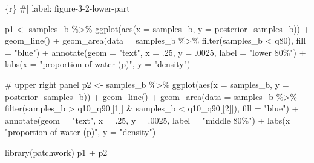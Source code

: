 \documentclass[
  letterpaper,
  DIV=11,
  numbers=noendperiod]{scrreprt}
\newenvironment{Shaded}{\begin{snugshade}}{\end{snugshade}}
\newcommand{\AttributeTok}[1]{\textcolor[rgb]{0.40,0.45,0.13}{#1}}
\newcommand{\CommentTok}[1]{\textcolor[rgb]{0.37,0.37,0.37}{#1}}
\newcommand{\DecValTok}[1]{\textcolor[rgb]{0.68,0.00,0.00}{#1}}
\newcommand{\FunctionTok}[1]{\textcolor[rgb]{0.28,0.35,0.67}{#1}}
\newcommand{\InformationTok}[1]{\textcolor[rgb]{0.37,0.37,0.37}{#1}}
\newcommand{\NormalTok}[1]{\textcolor[rgb]{0.00,0.23,0.31}{#1}}
\newcommand{\OtherTok}[1]{\textcolor[rgb]{0.00,0.23,0.31}{#1}}
\newcommand{\SpecialCharTok}[1]{\textcolor[rgb]{0.37,0.37,0.37}{#1}}
\newcommand{\StringTok}[1]{\textcolor[rgb]{0.13,0.47,0.30}{#1}}
\begin{document}
\begin{Shaded}
\begin{Highlighting}[]
\InformationTok{\textasciigrave{}\textasciigrave{}\textasciigrave{}\{r\}}
\CommentTok{\#| label: figure{-}3{-}2{-}lower{-}part}

\NormalTok{p1 }\OtherTok{\textless{}{-}}
\NormalTok{  samples\_b }\SpecialCharTok{\%\textgreater{}\%} 
  \FunctionTok{ggplot}\NormalTok{(}\FunctionTok{aes}\NormalTok{(}\AttributeTok{x =}\NormalTok{ samples\_b, }\AttributeTok{y =}\NormalTok{ posterior\_samples\_b)) }\SpecialCharTok{+}
  \FunctionTok{geom\_line}\NormalTok{() }\SpecialCharTok{+}
  \FunctionTok{geom\_area}\NormalTok{(}\AttributeTok{data =}\NormalTok{ samples\_b }\SpecialCharTok{\%\textgreater{}\%} \FunctionTok{filter}\NormalTok{(samples\_b }\SpecialCharTok{\textless{}}\NormalTok{ q80), }\AttributeTok{fill =} \StringTok{"blue"}\NormalTok{) }\SpecialCharTok{+}
  \FunctionTok{annotate}\NormalTok{(}\AttributeTok{geom =} \StringTok{"text"}\NormalTok{,}
           \AttributeTok{x =}\NormalTok{ .}\DecValTok{25}\NormalTok{, }\AttributeTok{y =}\NormalTok{ .}\DecValTok{0025}\NormalTok{,}
           \AttributeTok{label =} \StringTok{"lower 80\%"}\NormalTok{) }\SpecialCharTok{+}
  \FunctionTok{labs}\NormalTok{(}\AttributeTok{x =} \StringTok{"proportion of water (p)"}\NormalTok{,}
       \AttributeTok{y =} \StringTok{"density"}\NormalTok{)}

\CommentTok{\# upper right panel}
\NormalTok{p2 }\OtherTok{\textless{}{-}} 
\NormalTok{  samples\_b }\SpecialCharTok{\%\textgreater{}\%} 
  \FunctionTok{ggplot}\NormalTok{(}\FunctionTok{aes}\NormalTok{(}\AttributeTok{x =}\NormalTok{ samples\_b, }\AttributeTok{y =}\NormalTok{ posterior\_samples\_b)) }\SpecialCharTok{+}
  \FunctionTok{geom\_line}\NormalTok{() }\SpecialCharTok{+}
  \FunctionTok{geom\_area}\NormalTok{(}\AttributeTok{data =}\NormalTok{ samples\_b }\SpecialCharTok{\%\textgreater{}\%} \FunctionTok{filter}\NormalTok{(samples\_b }\SpecialCharTok{\textgreater{}}\NormalTok{ q10\_q90[[}\DecValTok{1}\NormalTok{]] }\SpecialCharTok{\&}\NormalTok{ samples\_b }\SpecialCharTok{\textless{}}\NormalTok{ q10\_q90[[}\DecValTok{2}\NormalTok{]]), }\AttributeTok{fill =} \StringTok{"blue"}\NormalTok{) }\SpecialCharTok{+}
  \FunctionTok{annotate}\NormalTok{(}\AttributeTok{geom =} \StringTok{"text"}\NormalTok{,}
           \AttributeTok{x =}\NormalTok{ .}\DecValTok{25}\NormalTok{, }\AttributeTok{y =}\NormalTok{ .}\DecValTok{0025}\NormalTok{,}
           \AttributeTok{label =} \StringTok{"middle 80\%"}\NormalTok{) }\SpecialCharTok{+}
  \FunctionTok{labs}\NormalTok{(}\AttributeTok{x =} \StringTok{"proportion of water (p)"}\NormalTok{,}
       \AttributeTok{y =} \StringTok{"density"}\NormalTok{)}

\FunctionTok{library}\NormalTok{(patchwork)}
\NormalTok{p1 }\SpecialCharTok{+}\NormalTok{ p2}
\InformationTok{\textasciigrave{}\textasciigrave{}\textasciigrave{}}
\end{Highlighting}
\end{Shaded}
\end{document}
